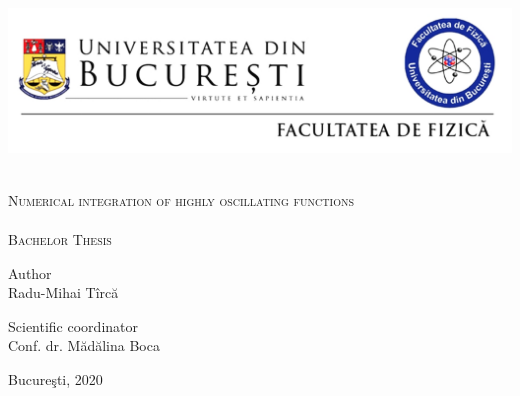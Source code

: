 \begin{titlepage}
\begin{center}





\includegraphics[width=16cm]{./antet_L.jpg}



\vspace{4cm}



    \HRule \\[0.3cm]


    {\Large \textsc {Numerical integration of highly oscillating functions}}\\


  \HRule \\[1.1cm]

  \textsc{\large Bachelor Thesis}\\[4cm]

   \begin{flushleft} \large
    {Author} \\[0.1cm]
    Radu-Mihai T\^{i}rc\u{a}
   \end{flushleft}

   \begin{flushright} \large
    {Scientific coordinator} \\[0.1cm]
    Conf. dr. M\u{a}d\u{a}lina Boca
   \end{flushright}


  \vfill


 {\large Bucure\c{s}ti, 2020}

\end{center}

\end{titlepage}
